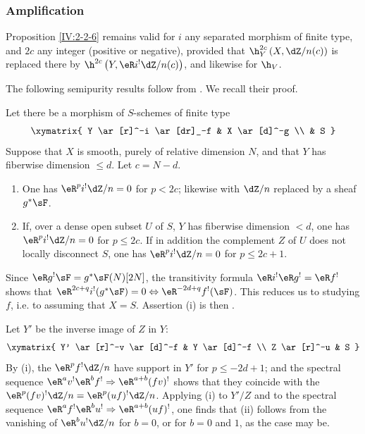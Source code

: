\documentclass[oneside]{book}
\begin{document}
\subsubsection{Amplification}\label{IV:2-2-7}

Proposition \ref{IV:2-2-6} remains valid for $i$ any separated morphism of
finite type, and $2 c$ any integer (positive or negative), provided that
$\h_Y^{2 c}\left(X,\dZ/n(c)\right)$ is replaced there by
$\h^{2 c}\left(Y,\eR i^!\dZ/n(c)\right)$, and likewise for $\h_V$.

The following semipurity results follow from \cite[1.8, 1.10, 1.15]{sga2}.
We recall their proof.






\begin{theorem}\label{IV:2-2-8}
Let there be a morphism of $S$-schemes of finite type
\[\xymatrix{
  Y \ar[r]^-i \ar[dr]_-f
    & X \ar[d]^-g \\
  & S
}\]
Suppose that $X$ is smooth, purely of relative dimension $N$, and that $Y$
has fiberwise dimension $\leqslant d$. Let $c=N-d$.
\begin{enumerate}[\indent (i)]
  \item One has $\eR^p i^!\dZ/n=0$ for $p<2 c$; likewise with $\dZ/n$
    replaced by a sheaf $g^* \sF$.
  \item If, over a dense open subset $U$ of $S$, $Y$ has fiberwise dimension
    $<d$, one has $\eR^p i^!\dZ/n=0$ for $p\leqslant 2 c$. If in addition
    the complement $Z$ of $U$ does not locally disconnect $S$, one has
    $\eR^pi^!\dZ/n=0$ for $p\leqslant 2 c+1$.
\end{enumerate}
\end{theorem}

Since $\eR g^! \sF=g^*\sF(N)[2N]$, the transitivity formula
$\eR i^!\eR g^!=\eR f^!$ shows that
$\eR^{2 c+q} i^!(g^*\sF)=0\Leftrightarrow \eR^{-2 d+q}f^!(\sF)$. This reduces
us to studying $f$, i.e. to assuming that $X=S$. Assertion (i) is then
\cite[XVIII 3.17]{sga4}.

Let $Y'$ be the inverse image of $Z$ in $Y$:
\[\xymatrix{
  Y' \ar[r]^-v \ar[d]^-f
    & Y \ar[d]^-f \\
  Z \ar[r]^-u
    & S
}\]
By (i), the $\eR^p f^! \dZ/n$ have support in $Y'$ for
$p\leqslant -2 d+1$; and the spectral sequence
$\eR^a v^!\eR^b f^! \Rightarrow \eR^{a+b} (f v)^!$ shows that they coincide
with the $\eR^p(f v)^!\dZ/n=\eR^p(u f)^!\dZ/n$. Applying (i) to $Y'/Z$ and
to the spectral sequence
$\eR^a f^!\eR^b u^! \Rightarrow \eR^{a+b} (u f)^!$, one finds that (ii)
follows from the vanishing of $\eR^b u^! \dZ/n$ for $b=0$, or for $b=0$ and
$1$, as the case may be.
\end{document}
